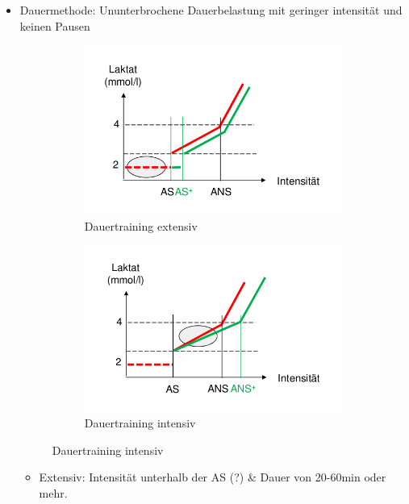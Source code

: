 \begin{itemize}
  \item Dauermethode: Ununterbrochene Dauerbelastung mit geringer intensität und keinen Pausen
  \begin{figure}[H]
          \centering
          \begin{subfigure}[b]{0.4\textwidth}
            \includegraphics[width=\textwidth]{pictures/dauertraining_extensiv.png}
            \caption{Dauertraining extensiv}
          \end{subfigure}
          \begin{subfigure}[b]{0.4\textwidth}
            \includegraphics[width=\textwidth]{pictures/dauertraining_intensiv.png}
            \caption{Dauertraining intensiv}
          \end{subfigure}
        \end{figure}
    \begin{itemize}
      \item Extensiv: Intensität unterhalb der AS (?) \& Dauer von 20-60min oder mehr.\\

\end{itemize}
\end{itemize}
